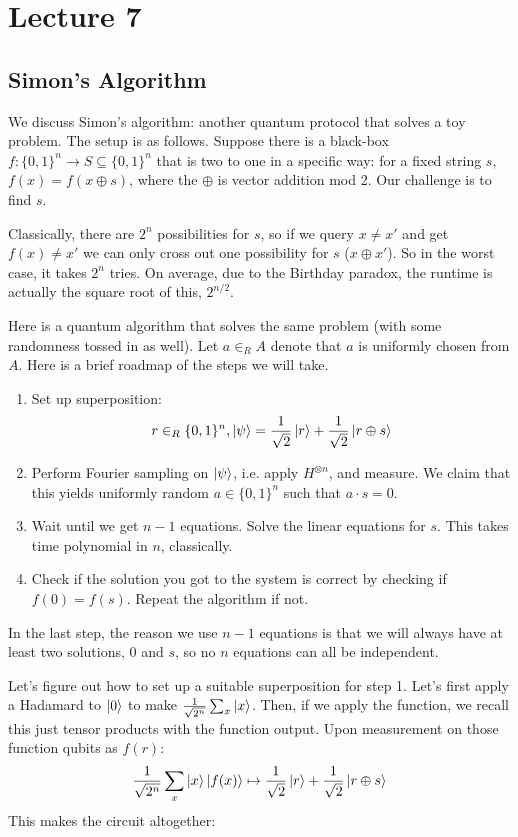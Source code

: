 
\section{Lecture 7}

\subsection{Simon's Algorithm}
We discuss Simon's algorithm: another quantum protocol that solves a toy problem. The setup is as follows.
Suppose there is a black-box $f: \{0, 1\}^n \to S \subseteq \{0, 1\}^n$ that is two to one in a specific way: for a fixed string $s$, $f(x) = f(x \oplus s)$,
where the $\oplus$ is vector addition mod 2. Our challenge is to find $s$.

Classically, there are $2^n$ possibilities for $s$, so if we query $x \neq x'$ and get $f(x) \neq x'$ we can only
cross out one possibility for $s$ ($x \oplus x'$). So in the worst case, it takes $2^n$ tries. On average, due to the Birthday paradox,
the runtime is actually the square root of this, $2^{n/2}$.

Here is a quantum algorithm that solves the same problem (with some randomness tossed in as well). Let $a \in_R A$ denote that $a$ is uniformly chosen
from $A$. Here is a brief roadmap of the steps we will take.
\begin{enumerate}
    \item Set up superposition:
    \[ r \in_R \{0, 1\}^n, \ket{\psi} = \frac{1}{\sqrt{2}} \ket{r} + \frac{1}{\sqrt{2}} \ket{r \oplus s} \]
    \item Perform Fourier sampling on $\ket{\psi}$, i.e. apply $H^{\otimes n}$, and measure. We claim that this yields uniformly random $a \in \{0, 1\}^n$ such that $a \cdot s = 0$.
    \item Wait until we get $n - 1$ equations. Solve the linear equations for $s$. This takes time polynomial in $n$, classically.
    \item Check if the solution you got to the system is correct by checking if $f(0) = f(s)$. Repeat the algorithm if not.
\end{enumerate}
In the last step, the reason we use $n - 1$ equations is that we will always have at least two solutions, $0$ and $s$, so no $n$ equations can all be independent.

Let's figure out how to set up a suitable superposition for step 1. Let's first apply a Hadamard to $\ket{0}$
to make $\frac{1}{\sqrt{2^n}}\sum_x \ket{x}$. Then, if we apply the function, we recall this just tensor products with the function output. Upon measurement on those function qubits
as $f(r)$:
\[ \frac{1}{\sqrt{2^n}} \sum_x \ket{x} \ket{f(x)} \mapsto \frac{1}{\sqrt{2}} \ket{r} + \frac{1}{\sqrt{2}} \ket{r \oplus s}  \]
This makes the circuit altogether:

